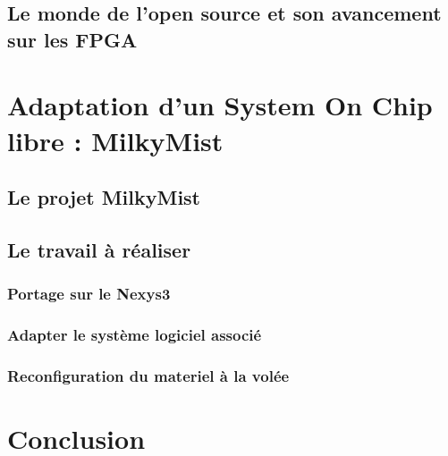 \documentclass{report}
\begin{document}
\section{Le monde de l'open source et son avancement sur les FPGA}
    
    \newpage

\chapter{Adaptation d'un System On Chip libre : MilkyMist}
\newpage

\section{Le projet MilkyMist}
    
    \newpage

\section{Le travail à réaliser}

\subsection{Portage sur le Nexys3}
    
    \newpage

\subsection{Adapter le système logiciel associé}
    
    \newpage

\subsection{Reconfiguration du materiel à la volée}
    
    \newpage

\chapter*{Conclusion}
    

\newpage



\nocite{*}



\end{document}
